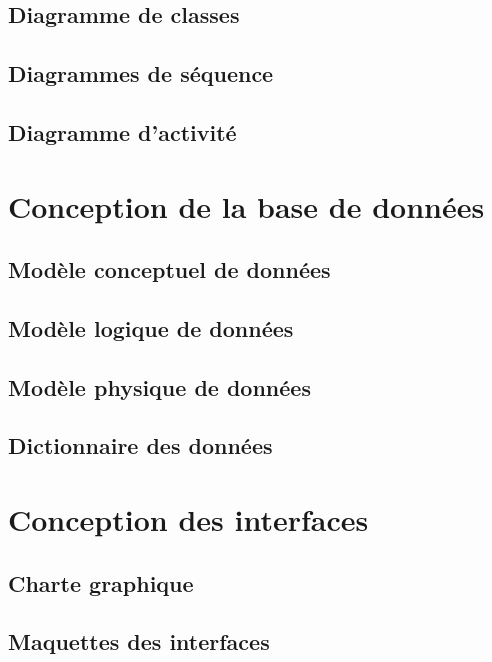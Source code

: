 \subsection{Diagramme de classes}

\subsection{Diagrammes de séquence}

\subsection{Diagramme d'activité}

\section{Conception de la base de données}

\subsection{Modèle conceptuel de données}

\subsection{Modèle logique de données}

\subsection{Modèle physique de données}

\subsection{Dictionnaire des données}

\section{Conception des interfaces}

\subsection{Charte graphique}

\subsection{Maquettes des interfaces}

